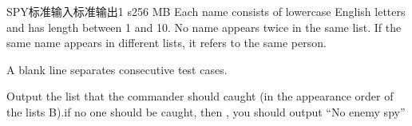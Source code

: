 \begin{problem}{SPY}{标准输入}{标准输出}{1 s}{256 MB}
Each name consists of lowercase English letters and has length between 1 and 10.
No name appears twice in the same list. If the same name appears in different lists, it refers to the same person.

A blank line separates consecutive test cases.

    \OutputFile
Output the list that the commander should caught (in the appearance order of the lists B).if no one should be caught, then , you should output “No enemy spy”

    \Example

    \begin{example}
    \end{example}
\end{problem}